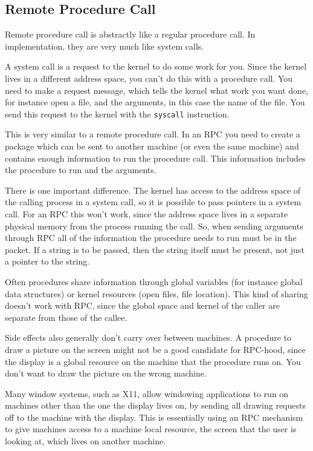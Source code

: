 \subsection{Remote Procedure Call}

Remote procedure call is abstractly like a regular procedure call.  In
implementation, they are very much like system calls.

A system call
is a request to the kernel to do some work for you.  Since the kernel
lives in a different address space, you can't do this with a procedure call.
You need to make a request message, which tells the kernel what work you
want done, for instance open a file, and the arguments, in this case
the name of the file.  You send this request to the kernel with the
{\tt syscall} instruction.

This is very similar to a remote procedure call.  In an RPC you need to
create a package which can be sent to another machine (or even the same
machine) and contains enough information to run the procedure call.
This information includes the procedure to run and the arguments.

There is one important difference.
The kernel has access to the address space of the calling process in a system
call, so it is possible to pass pointers in a system call.  For an RPC this
won't work, since the address space lives in a separate physical memory from
the process running the call.  So, when sending arguments through RPC all
of the information the procedure needs to run must be in the packet.  If
a string is to be passed, then the string itself must be present, not just
a pointer to the string.

Often procedures share information through global variables (for instance
global data structures) or kernel resources (open files, file location).
This kind of sharing doesn't work with RPC, since the global space and kernel
of the caller are separate from those of the callee.

Side effects also generally don't carry over between machines.
A procedure to draw a picture on the screen might not be a good candidate for
RPC-hood, since the display is a global resource on the machine that the
procedure runs on.  You don't want to draw the picture on the wrong machine.

Many window systems, such as X11, allow windowing applications to
run on machines other than the one the display lives on, by sending all
drawing requests off to the machine with the display.  This is essentially
using an RPC mechanism to give machines access to a machine local resource,
the screen that the user is looking at, which lives on another machine.

